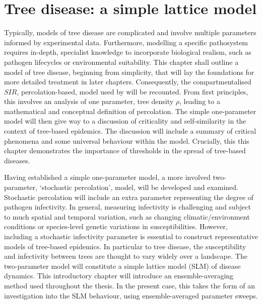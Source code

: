 
\chapter{Tree disease: a simple lattice model}
\label{chapter:SLM}
Typically, models of tree disease are complicated and involve multiple parameters informed by experimental data. Furthermore, modelling a specific pathosystem requires in-depth, specialist knowledge to incorporate biological realism, such as pathogen lifecycles or environmental suitability. This chapter shall outline a model of tree disease, beginning from simplicity, that will lay the foundations for more detailed treatment in later chapters.
Consequently, the compartmentalised $SIR$, percolation-based, model used by \cite{OROZCOFUENTES201912} will be recounted. 
From first principles, this involves an analysis of one parameter, tree density $\rho$, leading to a mathematical and conceptual definition of percolation. 
The simple one-parameter model will then give way to a discussion of criticality and self-similarity in the context of tree-based epidemics. 
The discussion will include a summary of critical phenomena and some universal behaviour within the model.
Crucially, this this chapter demonstrates the importance of thresholds in the spread of tree-based diseases.

Having established a simple one-parameter model, a more involved two-parameter, `stochastic percolation', model, will be developed and examined. 
Stochastic percolation will include an extra parameter representing the degree of pathogen infectivity. 
In general, measuring infectivity is challenging and subject to much spatial and temporal variation, such as changing climatic/environment conditions or species-level genetic variations in susceptibilities.  
However, including a stochastic infectivity parameter is essential to construct representative models of tree-based epidemics. 
In particular to tree disease, the susceptibility and infectivity between trees are thought to vary widely over a landscape. 
The two-parameter model will constitute a simple lattice model (SLM) of disease dynamics. This introductory chapter will introduce an ensemble-averaging method used throughout the thesis. 
In the present case, this takes the form of an investigation into the SLM behaviour, using ensemble-averaged parameter sweeps.

